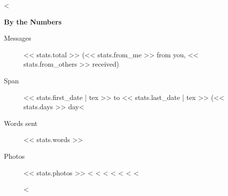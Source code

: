\documentclass[10pt,oneside]{memoir}
\begin{document}
<%
\movetooddpage
\begin{center}{\Large\bfseries By the Numbers}\end{center}
\bigskip
\begin{description}
\item[Messages] << stats.total >> (<< stats.from_me >> from you, << stats.from_others >> received)
\item[Span] << stats.first_date | tex >> to << stats.last_date | tex >> (<< stats.days >> day<%
\item[Words sent] << stats.words >>
\item[Photos] << stats.photos >>
<%
<%
<%
<%
<%
<%
<%

\movetooddpage
\tableofcontents

\cleartorecto
\mainmatter
{}
\addtolength\afterchapskip{1cm}

<%

\end{description}
\end{document}

